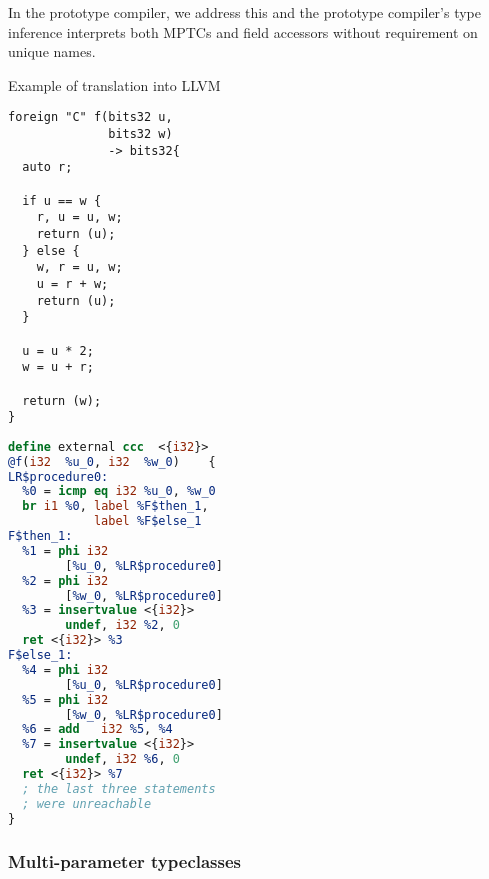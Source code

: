 In the prototype compiler, we address this and the prototype compiler's type inference interprets both MPTCs and field accessors without requirement on unique names.
\begin{listing}
    \small
    \caption{Example of translation into LLVM}
    \label{lst:translex}
    \begin{center}
    \begin{minipage}{0.5\linewidth}
    \begin{lstlisting}
foreign "C" f(bits32 u,
              bits32 w)
              -> bits32{
  auto r;

  if u == w {
    r, u = u, w;
    return (u);
  } else {
    w, r = u, w;
    u = r + w;
    return (u);
  }

  u = u * 2;
  w = u + r;

  return (w);
}
    \end{lstlisting}
    \end{minipage}%
    \begin{minipage}{0.5\linewidth}
    \begin{lstlisting}[language=LLVM]
define external ccc  <{i32}>
@f(i32  %u_0, i32  %w_0)    {
LR$procedure0:
  %0 = icmp eq i32 %u_0, %w_0
  br i1 %0, label %F$then_1,
            label %F$else_1
F$then_1:
  %1 = phi i32
        [%u_0, %LR$procedure0]
  %2 = phi i32
        [%w_0, %LR$procedure0]
  %3 = insertvalue <{i32}>
        undef, i32 %2, 0
  ret <{i32}> %3
F$else_1:
  %4 = phi i32
        [%u_0, %LR$procedure0]
  %5 = phi i32
        [%w_0, %LR$procedure0]
  %6 = add   i32 %5, %4
  %7 = insertvalue <{i32}>
        undef, i32 %6, 0
  ret <{i32}> %7
  ; the last three statements
  ; were unreachable
}
    \end{lstlisting}
    \end{minipage}
    \end{center}
\end{listing}

\subsubsection{Multi-parameter typeclasses}

